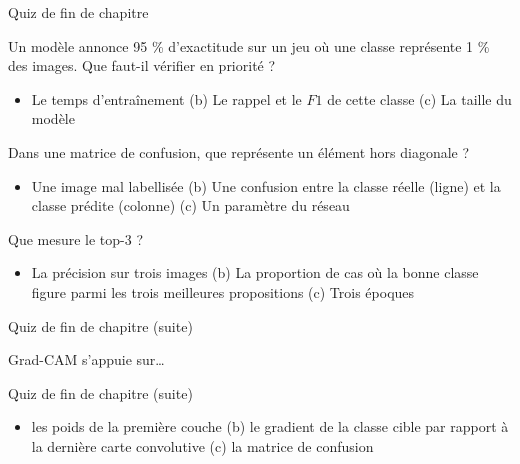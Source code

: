 \begin{frame}{Quiz de fin de chapitre}
\begin{qbox}[Question 1]
Un modèle annonce 95 \% d'exactitude sur un jeu où une classe représente
1 \% des images. Que faut-il vérifier en priorité ?
\begin{itemize}
  \item[(a)] Le temps d'entraînement \quad (b) Le rappel et le $F1$ de cette classe
  \quad (c) La taille du modèle
\end{itemize}
\end{qbox}
\begin{qbox}[Question 2]
Dans une matrice de confusion, que représente un élément hors diagonale ?
\begin{itemize}
  \item[(a)] Une image mal labellisée \quad (b) Une confusion entre la classe réelle
  (ligne) et la classe prédite (colonne) \quad (c) Un paramètre du réseau
\end{itemize}
\end{qbox}
\begin{qbox}[Question 3]
Que mesure le top-3 ?
\begin{itemize}
  \item[(a)] La précision sur trois images \quad (b) La proportion de cas où la bonne
  classe figure parmi les trois meilleures propositions \quad (c) Trois époques
\end{itemize}
\end{qbox}

\end{frame}
\begin{frame}{Quiz de fin de chapitre (suite)}
\begin{qbox}[Question 4]
Grad-CAM s'appuie sur\dots

\end{qbox}
\end{frame}
\begin{frame}{Quiz de fin de chapitre (suite)}
\begin{itemize}
  \item[(a)] les poids de la première couche \quad (b) le gradient de la classe cible
  par rapport à la dernière carte convolutive \quad (c) la matrice de confusion
\end{itemize}
\end{frame}

